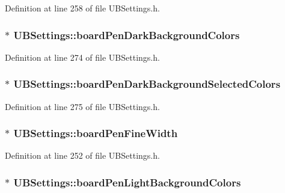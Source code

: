 Definition at line 258 of file U\-B\-Settings.\-h.

\hypertarget{class_u_b_settings_a3930fcf1b8ca3202ac6c38fcb0d02b16}{
\subsubsection[{board\-Pen\-Dark\-Background\-Colors}]{$\ast$ U\-B\-Settings\-::board\-Pen\-Dark\-Background\-Colors}}\label{db/d66/class_u_b_settings_a3930fcf1b8ca3202ac6c38fcb0d02b16}


Definition at line 274 of file U\-B\-Settings.\-h.

\hypertarget{class_u_b_settings_afbce5811f6a1971349a19050393d7471}{
\subsubsection[{board\-Pen\-Dark\-Background\-Selected\-Colors}]{$\ast$ U\-B\-Settings\-::board\-Pen\-Dark\-Background\-Selected\-Colors}}\label{db/d66/class_u_b_settings_afbce5811f6a1971349a19050393d7471}


Definition at line 275 of file U\-B\-Settings.\-h.

\hypertarget{class_u_b_settings_a05a5a33384a6406c8e4185e224458877}{
\subsubsection[{board\-Pen\-Fine\-Width}]{$\ast$ U\-B\-Settings\-::board\-Pen\-Fine\-Width}}\label{db/d66/class_u_b_settings_a05a5a33384a6406c8e4185e224458877}


Definition at line 252 of file U\-B\-Settings.\-h.

\hypertarget{class_u_b_settings_afe36b37ed64b4ce64c263e1ab0b32541}{
\subsubsection[{board\-Pen\-Light\-Background\-Colors}]{$\ast$ U\-B\-Settings\-::board\-Pen\-Light\-Background\-Colors}}\label{db/d66/class_u_b_settings_afe36b37ed64b4ce64c263e1ab0b32541}


